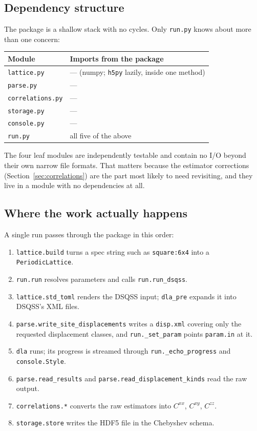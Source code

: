 \documentclass[11pt,a4paper]{article}
\newcommand{\code}[1]{\texttt{#1}}
\begin{document}
\subsection{Dependency structure}

The package is a shallow stack with no cycles. Only \code{run.py} knows about
more than one concern:

\begin{center}
\begin{tabular}{ll}
\toprule
Module & Imports from the package \\
\midrule
\code{lattice.py}     & --- (numpy; \code{h5py} lazily, inside one method) \\
\code{parse.py}       & --- \\
\code{correlations.py}& --- \\
\code{storage.py}     & --- \\
\code{console.py}     & --- \\
\code{run.py}         & all five of the above \\
\bottomrule
\end{tabular}
\end{center}

The four leaf modules are independently testable and contain no I/O beyond their
own narrow file formats. That matters because the estimator corrections
(Section~\ref{sec:correlations}) are the part most likely to need revisiting,
and they live in a module with no dependencies at all.

\subsection{Where the work actually happens}

A single run passes through the package in this order:

\begin{enumerate}
  \item \code{lattice.build} turns a spec string such as \code{square:6x4} into a
    \code{PeriodicLattice}.
  \item \code{run.run} resolves parameters and calls \code{run.run\_dsqss}.
  \item \code{lattice.std\_toml} renders the DSQSS input; \code{dla\_pre}
    expands it into DSQSS's XML files.
  \item \code{parse.write\_site\_displacements} writes a \code{disp.xml} covering
    only the requested displacement classes, and \code{run.\_set\_param} points
    \code{param.in} at it.
  \item \code{dla} runs; its progress is streamed through
    \code{run.\_echo\_progress} and \code{console.Style}.
  \item \code{parse.read\_results} and \code{parse.read\_displacement\_kinds}
    read the raw output.
  \item \code{correlations.*} converts the raw estimators into
    $C^{xx}$, $C^{xy}$, $C^{zz}$.
  \item \code{storage.store} writes the HDF5 file in the Chebyshev schema.
\end{enumerate}
\end{document}
